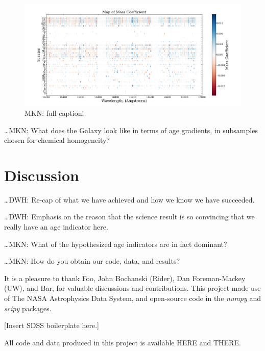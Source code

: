 \documentclass[12pt, preprint]{aastex}
\newcommand{\project}[1]{\textsl{#1}}
\begin{document}
\begin{figure}[p!]
  \includegraphics[scale=0.21]{./plots/mass_coefficient.png}
  \caption{MKN: full caption!} 
\label{fig:maps}
\end{figure}

\ldots MKN: What does the Galaxy look like in terms of age gradients,
in subsamples chosen for chemical homogeneity?

\section{Discussion}

\ldots DWH: Re-cap of what we have achieved and how we know we have
succeeded.

\ldots DWH: Emphasis on the reason that the science result is so
convincing that we really have an age indicator here.

\ldots MKN: What of the hypothesized age indicators are in fact
dominant?

\ldots MKN: How do you obtain our code, data, and results?

\acknowledgments
It is a pleasure to thank
  Foo,
  John Bochanski (Rider),
  Dan Foreman-Mackey (UW), and
  Bar,
for valuable discussions and contributions.
This project made use of
  The NASA Astrophysics Data System,
  and open-source code in the \project{numpy} and \project{scipy} packages.

[Insert SDSS boilerplate here.]

All code and data produced in this project is available HERE and THERE.


\end{document}
